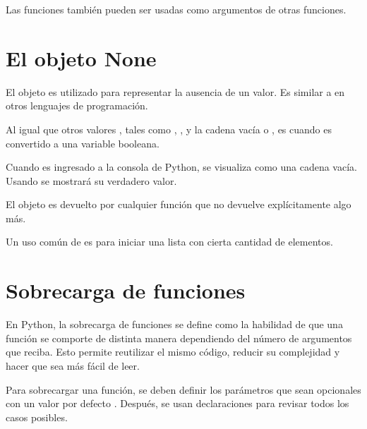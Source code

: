 Las funciones también pueden ser usadas como argumentos de otras funciones.


\section{El objeto None}

El objeto  es utilizado para representar la ausencia de un valor.
Es similar a  en otros lenguajes de programación.

Al igual que otros valores , tales como \ttt{()}, \ttt{[]}, \ttt{\{\}} y la cadena vacía \ttt{\qq \qq} o \ttt{\q \q}, es  cuando es convertido a una variable booleana.


Cuando es ingresado a la consola de Python, se visualiza como una cadena vacía.
Usando  se mostrará su verdadero valor.


El objeto  es devuelto por cualquier función que no devuelve explícitamente algo más.


Un uso común de  es para iniciar una lista con cierta cantidad de elementos.


\section{Sobrecarga de funciones}

En Python, la sobrecarga de funciones se define como la habilidad de que una función se comporte de distinta manera dependiendo del número de argumentos que reciba.
Esto permite reutilizar el mismo código, reducir su complejidad y hacer que sea más fácil de leer.

Para sobrecargar una función, se deben definir los parámetros que sean opcionales con un valor por defecto .
Después, se usan declaraciones  para revisar todos los casos posibles.

